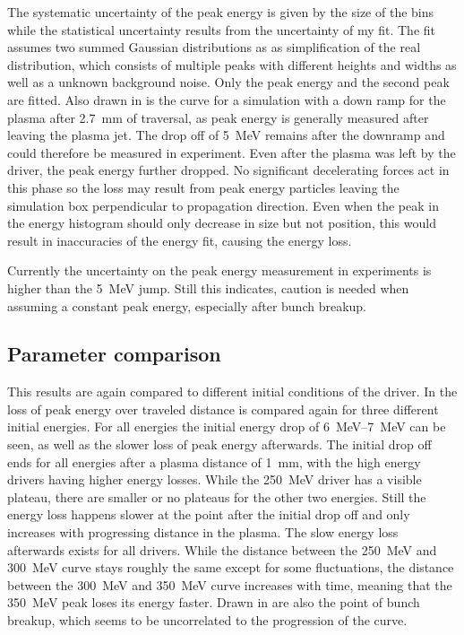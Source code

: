 \documentclass[bachelor_thesis]{subfiles}
\begin{document}
The systematic uncertainty of the peak energy is given by the size of the bins while the statistical uncertainty results from the uncertainty of my fit.  The fit assumes two summed Gaussian distributions as as
simplification of the real distribution, which consists of multiple peaks with different heights and widths as well as a unknown background noise. Only the peak energy and the second peak are fitted.
Also drawn in is the curve for a simulation with a down ramp for the plasma after \qty{2.7}{\mm} of traversal, as peak energy is generally measured after leaving the plasma jet. The drop off of \qty{5}{\MeV} remains after 
the downramp and could therefore be measured in experiment. Even after the plasma was left by the driver, the peak energy further dropped. No significant decelerating forces act in this phase so the loss may result
from peak energy particles leaving the simulation box perpendicular to propagation direction. Even when the peak in the energy histogram should only decrease in size but not position, this would result in inaccuracies of the energy fit,
causing the energy loss.

Currently the uncertainty on the peak energy measurement in experiments is higher than the \qty{5}{\MeV} jump. Still this indicates, caution is needed when assuming a constant peak energy, especially after bunch breakup.

\subsection{Parameter comparison}
This results are again compared to different initial conditions of the driver. In  the loss of peak energy over traveled distance is compared again for three different initial energies.
For all energies the initial energy drop of \qtyrange{6}{7}{\MeV} can be seen, as well as the slower loss of peak energy afterwards. The initial drop off ends for all energies after a plasma distance of \qty{1}{\mm}, with the high energy drivers having higher energy losses. 
While the \qty{250}{\MeV} driver has a visible plateau, there are smaller or no plateaus for the other two energies. Still the energy loss happens slower at the point after the initial drop off and only increases with progressing distance in the plasma.
The slow energy loss afterwards exists for all drivers. While the distance between the \qty{250}{\MeV} and \qty{300}{\MeV} curve stays roughly the same except for some fluctuations, 
the distance between the \qty{300}{\MeV} and \qty{350}{\MeV} curve increases with time, meaning that the \qty{350}{\MeV} peak loses its energy faster. Drawn in are also the point of bunch breakup, which seems to be uncorrelated to the progression of the curve.
\end{document}

